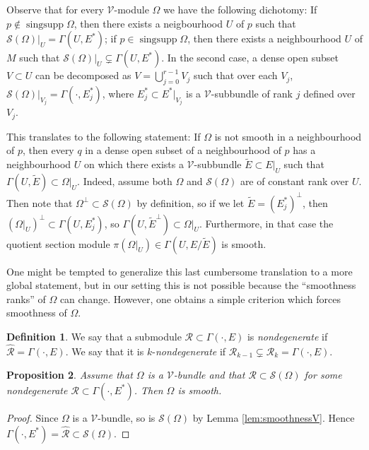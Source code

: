 \documentclass[11pt]{amsart}
\newcommand{\crb}{\mathcal{V}}
\DeclareMathOperator{\singsupp}{sing supp}
\theoremstyle{definition}
\newtheorem{defn}{Definition}[section]
\theoremstyle{remark}
\theoremstyle{plain}
\newtheorem{prop}[defn]{Proposition}
\begin{document}
Observe that for every  $\crb$-module $\Omega$ we have the
following dichotomy: If $p\notin \singsupp \Omega$, then there exists a neigbourhood $U$ of
$p$ such that $\mathcal{S}(\Omega)|_U = \Gamma (U,E^*) $; if $p\in \singsupp \Omega$, then
there exists a neighbourhood $U$ of $M$ such that $\mathcal{S}(\Omega)|_U \subsetneq \Gamma(U,E^*)$.
In the second case, a dense open subset
$V\subset U$ can be decomposed as $V= \bigcup_{j=0}^{r-1}  V_j$ such
that over each $V_j$, $\mathcal{S}(\Omega)|_{V_j} = \Gamma(\cdot,E_j^*)$, where
$E_j^* \subset E^*|_{V_j}$ is a $\crb$-subbundle of rank $j$ defined over $V_j$.

This translates to the following statement: If $\Omega$ is not smooth in a neighbourhood of $p$,
then every $q$ in a dense open subset of a neighbourhood of $p$ has a neighbourhood
$U$ on which there exists a $\crb$-subbundle $\tilde E \subset E|_U$ such that
$ \Gamma (U, \tilde E) \subset \Omega|_U $.
Indeed, assume both $\Omega$ and $\mathcal{S}(\Omega)$ are of constant rank over $U$.
Then note that
$\Omega^\perp \subset \mathcal{S}(\Omega) $ by definition,
so if we let $\tilde E= (E_j^*)^\perp$,
then $(\Omega|_U)^\perp \subset \Gamma(U, E_j^*)$,
so $\Gamma(U, \tilde E^\perp) \subset \Omega|_U$.
Furthermore, in that case the quotient section module
$\pi(\Omega|_U) \in \Gamma(U,E/\tilde E)$ is smooth.

One might be tempted to generalize this last cumbersome translation to a more
global statement, but in our setting this is not possible because the ``smoothness ranks''
of $\Omega$ can change. However, one obtains a simple criterion which forces smoothness
of $\Omega$.

\begin{defn}
  We say that a submodule $\mathcal{R} \subset \Gamma(\cdot, E)$ is {\em nondegenerate}
  if $ \hat{ \mathcal{R}} =  \Gamma(\cdot, E)$. We say that it is $k$-{\em nondegenerate}
  if $\mathcal{R}_{k-1} \subsetneq \mathcal{R}_k = \Gamma(\cdot, E)$. 
\end{defn}

\begin{prop}\label{prop:nondegenerate}
  Assume that $\Omega$ is a $\crb$-bundle and that
  $ \mathcal{R} \subset \mathcal{S}(\Omega)$ for some nondegenerate
  $\mathcal{R} \subset \Gamma(\cdot,E^*)$. Then $\Omega$ is smooth. 
\end{prop}

\begin{proof}
  Since $\Omega$ is a $\crb$-bundle, so is $\mathcal{S} (\Omega)$ by Lemma \ref{lem:smoothnessV}. Hence   $ \Gamma(\cdot, E^*) = \hat{\mathcal{R}} \subset \mathcal{S}(\Omega)$. 
\end{proof}
\end{document}
